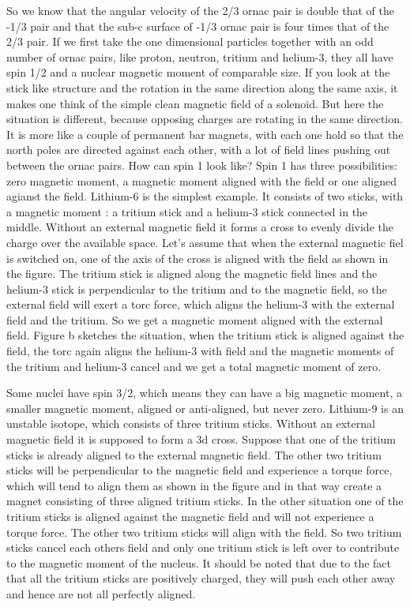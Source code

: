 So we know that the angular velocity of the 2/3 ornac pair is double that of the -1/3 pair and that the sub-c surface of -1/3 ornac pair is four times that of the 2/3 pair.
If we first take the one dimensional particles together with an odd number of ornac pairs, like proton, neutron, tritium and helium-3, they all have spin 1/2 and a nuclear magnetic moment of comparable size. If you look at the stick like structure and the rotation in the same direction along the same axis, it makes one think of the simple clean magnetic field of a solenoid. But here the situation is different, because opposing charges are rotating in the same direction. It is more like a couple of permanent bar magnets, with each one hold so that the north poles are directed against each other, with a lot of field lines pushing out between the ornac pairs. 
How can spin 1 look like? Spin 1 has three possibilities: zero magnetic moment, a magnetic moment aligned with the field or one aligned agianst the field. Lithium-6 is the simplest example. It consists of two sticks, with a magnetic moment    : a tritium stick and a helium-3 stick connected in the middle. Without an external magnetic field it forms a cross to evenly divide the charge over the available space. Let's assume that when the external magnetic fiel is switched on, one of the axis of the cross is aligned with the field as shown in the figure. The tritium stick is aligned along    the magnetic field lines and the helium-3 stick is perpendicular to the tritium and to the magnetic field, so the external field will exert a torc force, which aligns the helium-3 with the external field and the tritium. So we get a magnetic moment aligned with the external field. Figure b sketches the situation, when the tritium stick is aligned against the field, the torc again aligns the helium-3 with field and the magnetic moments of the tritium and helium-3 cancel and we get a total magnetic moment of zero.

Some nuclei have spin 3/2, which means they can have a big magnetic moment, a smaller magnetic moment, aligned or anti-aligned, but never zero. Lithium-9 is an unstable isotope, which consists of three tritium sticks. Without an external magnetic field it is supposed to form a 3d cross. Suppose that one of the tritium sticks is already aligned to the external magnetic field. The other two tritium sticks will be perpendicular to the magnetic field and experience a torque force, which will tend to align them as shown in the figure and in that way create a magnet consisting of three aligned tritium sticks. In the other situation one of the tritium sticks is aligned against the magnetic field and will not experience a torque force. The other two tritium sticks will align with the field. So two tritium sticks cancel each others field and only one tritium stick is left over to contribute to the magnetic moment of the nucleus. It should be noted that due to the fact that all the tritium sticks are positively charged, they will push each other away and hence are not all perfectly aligned.

